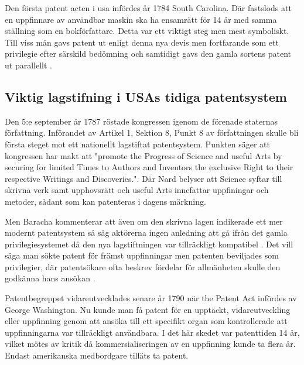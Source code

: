 Den första patent acten i usa infördes år 1784 South Carolina. Där fastslods att en uppfinnare av
användbar maskin ska ha ensamrätt för 14 år med samma ställning som en bokförfattare\cite{bracha}. Detta var ett viktigt steg men mest symboliskt. Till viss mån gavs patent ut enligt
denna nya devis men fortfarande som ett privilegie efter särskild bedömning och samtidigt gavs den gamla
sortens patent ut parallellt \cite{bracha}.



\subsection{Viktig lagstifning i USAs tidiga patentsystem}

Den 5:e september år 1787 röstade kongressen igenom de förenade staternas författning. Införandet av Artikel 1, Sektion 8, Punkt 8 av författningen skulle bli första steget mot ett nationellt lagstiftat patentsystem. Punkten säger att kongressen har
makt att "promote the Progress of Science and useful Arts by securing for limited Times to Authors and
Inventors the exclusive Right to their respective Writings and Discoveries.". Där Nard belyser att
Science syftar till skrivna verk samt upphovsrätt och useful Arts innefattar uppfiningar och metoder,
sådant som kan patenteras i dagens märkning\cite{nard}. 



Men Baracha kommenterar att även om den skrivna lagen indikerade ett mer modernt patentsystem så såg aktörerna ingen anledning att gå ifrån det gamla privilegiesystemet då den nya lagstiftningen var tillräckligt kompatibel \cite{bracha}. Det vill säga man sökte patent för främst uppfinningar men patenten beviljades som privilegier, där patentsökare ofta beskrev fördelar för allmänheten skulle den godkänna hans ansökan \cite{bracha}. %

Patentbegreppet vidareutvecklades senare år 1790 när the Patent Act infördes av George Washington. Nu
kunde man få patent för en upptäckt, vidareutveckling eller uppfinning genom att ansöka till ett
specifikt organ som kontrollerade att uppfinningarna var tillräckligt användbara\cite{nard}. I det här skedet var patenttiden 14 år, vilket mötes av kritik då kommersialiseringen 
 av en uppfinning kunde ta flera år. Endast amerikanska medbordgare tilläts ta patent\cite{nard}.  

